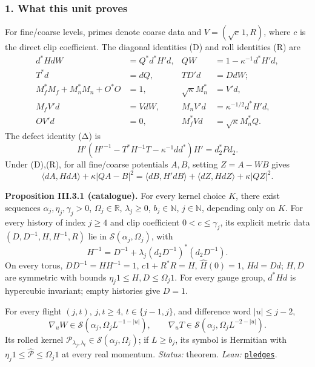 \documentclass[
  letterpaper,
  11pt]{article}
\begin{document}
\subsubsection{1. What this unit proves}\label{what-this-unit-proves-5}

For fine/coarse levels, primes denote coarse data and
\(V=(\sqrt c\,1,R)\), where \(c\) is the direct clip coefficient. The
diagonal identities (D) and roll identities (R) are \[\begin{aligned}
 d^*HdW&=Q^*d^*H'd,&QW&=1-\kappa^{-1}d^*H'd,\\
 T^*d&=dQ,&TD'd&=DdW;\\
 M_f^*M_f+M_n^*M_n+O^*O&=1,&\sqrt\kappa M_n^*&=V'd,\\
 M_fV'd&=VdW,&M_nV'd&=\kappa^{-1/2}d^*H'd,\\
 OV'd&=0,&M_f^*Vd&=\sqrt\kappa M_n^*Q.
\end{aligned}\] The defect identity (Δ) is
\[H'(H'^{-1}-T^*H^{-1}T-\kappa^{-1}dd^*)H'=d_2^*Pd_2.\] Under (D),(R),
for all fine/coarse potentials \(A,B\), setting \(Z=A-WB\) gives
\[\langle dA,HdA\rangle+\kappa|QA-B|^2=\langle dB,H'dB\rangle+\langle dZ,HdZ\rangle+\kappa|QZ|^2.\]

\textbf{Proposition III.3.1 (catalogue).} For every kernel choice \(K\),
there exist sequences \(\alpha_j,\eta_j,\gamma_j>0\),
\(\Omega_j\in\mathbb R\), \(\lambda_j\ge0\), \(b_j\in\mathbb N\),
\(j\in\mathbb N\), depending only on \(K\). For every history of index
\(j\ge4\) and clip coefficient \(0<c\le\gamma_j\), its explicit metric
data \((D,D^{-1},H,H^{-1},R)\) lie in \(\mathcal S(\alpha_j,\Omega_j)\),
with \[H^{-1}=D^{-1}+\lambda_j(d_2D^{-1})^*(d_2D^{-1}).\] On every
torus, \(DD^{-1}=HH^{-1}=1\), \(c1+R^*R=H\), \(\hat H(0)=1\), \(Hd=Dd\);
\(H,D\) are symmetric with bounds \(\eta_j1\le H,D\le\Omega_j1\). For
every gauge group, \(d^*Hd\) is hypercubic invariant; empty histories
give \(D=1\).

For every flight \((j,t)\), \(j,t\ge4\), \(t\in\{j-1,j\}\), and
difference word \(|u|\le j-2\),
\[\nabla_uW\in\mathcal S(\alpha_j,\Omega_jL^{-1-|u|}),\qquad\nabla_uT\in\mathcal S(\alpha_j,\Omega_jL^{-2-|u|}).\]
Its rolled kernel
\(\mathcal P_{\lambda_j,\lambda_t}\in\mathcal S(\alpha_j,\Omega_j)\); if
\(L\ge b_j\), its symbol is Hermitian with
\(\eta_j1\le\hat{\mathcal P}\le\Omega_j1\) at every real momentum.
\emph{Status:} theorem. \emph{Lean:}
\href{https://github.com/yang-mills-group/OpenAI-YM-20261028/blob/3456e5e75cf8d4cd558955a5c7638fba2d68f464/YM/Next/FREE_KERNELS/Priced.lean\#L67-L93}{\texttt{pledges}}.
\end{document}
